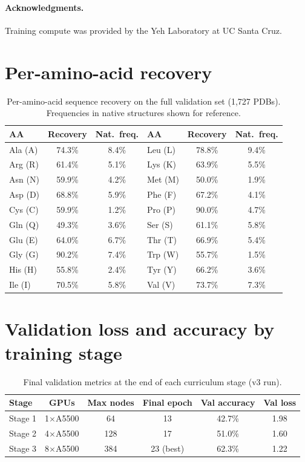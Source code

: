 \documentclass[11pt,letterpaper]{article}
\begin{document}
\paragraph{Acknowledgments.}
Training compute was provided by the Yeh Laboratory at UC Santa Cruz.

\appendix

\section{Per-amino-acid recovery}
\label{sec:aa_recovery}

\begin{table}[h]
\centering
\caption{Per-amino-acid sequence recovery on the full validation set (1{,}727 PDBs).
  Frequencies in native structures shown for reference.}
\label{tab:peraacov}
\setlength{\tabcolsep}{6pt}
\begin{tabular}{lcc|lcc}
\toprule
AA & Recovery & Nat.\ freq. & AA & Recovery & Nat.\ freq. \\
\midrule
Ala (A) & 74.3\% & 8.4\% & Leu (L) & 78.8\% & 9.4\% \\
Arg (R) & 61.4\% & 5.1\% & Lys (K) & 63.9\% & 5.5\% \\
Asn (N) & 59.9\% & 4.2\% & Met (M) & 50.0\% & 1.9\% \\
Asp (D) & 68.8\% & 5.9\% & Phe (F) & 67.2\% & 4.1\% \\
Cys (C) & 59.9\% & 1.2\% & Pro (P) & 90.0\% & 4.7\% \\
Gln (Q) & 49.3\% & 3.6\% & Ser (S) & 61.1\% & 5.8\% \\
Glu (E) & 64.0\% & 6.7\% & Thr (T) & 66.9\% & 5.4\% \\
Gly (G) & 90.2\% & 7.4\% & Trp (W) & 55.7\% & 1.5\% \\
His (H) & 55.8\% & 2.4\% & Tyr (Y) & 66.2\% & 3.6\% \\
Ile (I) & 70.5\% & 5.8\% & Val (V) & 73.7\% & 7.3\% \\
\bottomrule
\end{tabular}
\end{table}

\section{Validation loss and accuracy by training stage}
\label{sec:training_detail}

\begin{table}[h]
\centering
\caption{Final validation metrics at the end of each curriculum stage (v3 run).}
\label{tab:training_stages}
\begin{tabular}{lccccc}
\toprule
Stage & GPUs & Max nodes & Final epoch & Val accuracy & Val loss \\
\midrule
Stage 1 & 1$\times$A5500  & 64  & 13 & 42.7\% & 1.98 \\
Stage 2 & 4$\times$A5500  & 128 & 17 & 51.0\% & 1.60 \\
Stage 3 & 8$\times$A5500  & 384 & 23 (best) & 62.3\% & 1.22 \\
\bottomrule
\end{tabular}
\end{table}



\end{document}
